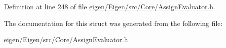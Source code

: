 Definition at line \hyperlink{eigen_2_eigen_2src_2_core_2_assign_evaluator_8h_source_l00248}{248} of file \hyperlink{eigen_2_eigen_2src_2_core_2_assign_evaluator_8h_source}{eigen/\+Eigen/src/\+Core/\+Assign\+Evaluator.\+h}.



The documentation for this struct was generated from the following file\+:\begin{DoxyCompactItemize}
\item 
eigen/\+Eigen/src/\+Core/\+Assign\+Evaluator.\+h\end{DoxyCompactItemize}
